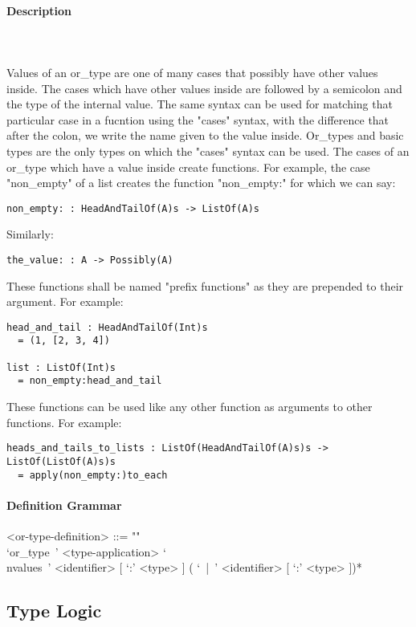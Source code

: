 \documentclass{article}
\def\pend{\mbox{} \\\\}
\begin{document}
\paragraph{Description}\pend
Values of an or\_type are one of many cases that possibly have other values inside.
The cases which have other values inside are followed by a semicolon and the 
type of the internal value. The same syntax can be used for matching that particular 
case in a fucntion using the "cases" syntax, with the difference that after the
colon, we write the name given to the value inside. 
Or\_types and basic types are the only types on which
the "cases" syntax can be used. The cases of an or\_type which have a value
inside create functions. For example, the case "non\_empty" of a list creates the
function "non\_empty:" for which we can say:
\begin{verbatim}
non_empty: : HeadAndTailOf(A)s -> ListOf(A)s
\end{verbatim}
Similarly:
\begin{verbatim}
the_value: : A -> Possibly(A)
\end{verbatim}
These functions shall be named "prefix functions" as they are prepended to their
argument.
For example:
\begin{verbatim}
head_and_tail : HeadAndTailOf(Int)s
  = (1, [2, 3, 4])

list : ListOf(Int)s
  = non_empty:head_and_tail
\end{verbatim}
These functions can be used like any other function as arguments to other functions.
For example:
\begin{verbatim}
heads_and_tails_to_lists : ListOf(HeadAndTailOf(A)s)s -> ListOf(ListOf(A)s)s
  = apply(non_empty:)to_each
\end{verbatim}

\paragraph{Definition Grammar}
\begin{grammar}
<or-type-definition> ::= ""\\
`or_type\ ' <type-application> 
`\\nvalues\ ' <identifier> [ `:' <type> ] ( `\ |\ ' <identifier> [ `:' <type> ])*
\end{grammar}

\subsection{Type Logic}
\end{document}
